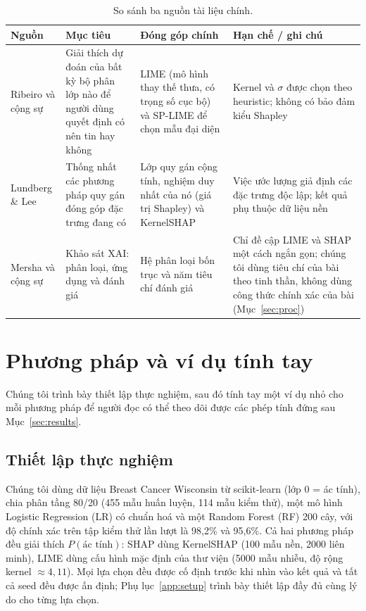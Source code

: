 \documentclass[11pt,a4paper]{article}
\begin{document}
\begin{table}[!htb]
\centering\small
\caption{So sánh ba nguồn tài liệu chính.}\label{tab:sources}
\begin{tabularx}{\textwidth}{L{3.0cm}XXX}
\toprule
\textbf{Nguồn} & \textbf{Mục tiêu} & \textbf{Đóng góp chính} & \textbf{Hạn chế / ghi chú}\\
\midrule
Ribeiro và cộng sự~\cite{ribeiro} & Giải thích dự đoán của bất kỳ bộ phân lớp nào để người dùng quyết định có nên tin hay không & LIME (mô hình thay thế thưa, có trọng số cục bộ) và SP-LIME để chọn mẫu đại diện & Kernel và $\sigma$ được chọn theo heuristic; không có bảo đảm kiểu Shapley\\
Lundberg \& Lee~\cite{lundberg} & Thống nhất các phương pháp quy gán đóng góp đặc trưng đang có & Lớp quy gán cộng tính, nghiệm duy nhất của nó (giá trị Shapley) và KernelSHAP & Việc ước lượng giả định các đặc trưng độc lập; kết quả phụ thuộc dữ liệu nền\\
Mersha và cộng sự~\cite{mersha} & Khảo sát XAI: phân loại, ứng dụng và đánh giá & Hệ phân loại bốn trục và năm tiêu chí đánh giá & Chỉ đề cập LIME và SHAP một cách ngắn gọn; chúng tôi dùng tiêu chí của bài theo tinh thần, không dùng công thức chính xác của bài (Mục~\ref{sec:proc})\\
\bottomrule
\end{tabularx}
\end{table}

\section{Phương pháp và ví dụ tính tay}
Chúng tôi trình bày thiết lập thực nghiệm, sau đó tính tay một ví dụ nhỏ cho
mỗi phương pháp để người đọc có thể theo dõi được các phép tính đứng sau
Mục~\ref{sec:results}.

\subsection{Thiết lập thực nghiệm}
Chúng tôi dùng dữ liệu Breast Cancer Wisconsin \cite{street} từ scikit-learn
(lớp 0 = ác tính), chia phân tầng 80/20 (455 mẫu huấn luyện, 114 mẫu kiểm
thử), một mô hình Logistic Regression (LR) có chuẩn hoá và một Random Forest
(RF) 200 cây, với độ chính xác trên tập kiểm thử lần lượt là 98,2\% và
95,6\%. Cả hai phương pháp đều giải thích $P(\text{ác tính})$: SHAP dùng
KernelSHAP (100 mẫu nền, 2000 liên minh), LIME dùng cấu hình mặc định của thư
viện (5000 mẫu nhiễu, độ rộng kernel $\approx 4{,}11$). Mọi lựa chọn đều được
cố định trước khi nhìn vào kết quả và tất cả seed đều được ấn định;
Phụ lục~\ref{app:setup} trình bày thiết lập đầy đủ cùng lý do cho từng lựa
chọn.
\end{document}
